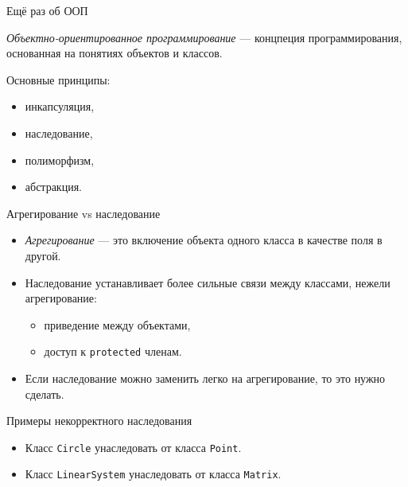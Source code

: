 \documentclass{beamer}
\begin{document}
\begin{frame}[fragile]{Ещё раз об ООП}

    {\em Объектно-ориентированное программирование} — 
    концпеция программирования, основанная на
    понятиях объектов и классов.

   \begin{block}{Основные принципы:}
   \begin{itemize}
       \item инкапсуляция,
       \item наследование,
       \item полиморфизм,
       \item абстракция.
   \end{itemize}
   \end{block}
\end{frame}

\begin{frame}[fragile]{Агрегирование vs наследование}
    \begin{itemize}
        \item {\em Агрегирование} — это включение объекта одного 
            класса в качестве поля в другой.

        \item Наследование устанавливает более сильные связи
            между классами, нежели агрегирование:
            \begin{itemize}
                \item приведение между объектами,
                \item доступ к {\tt protected} членам.
            \end{itemize}

        \item Если наследование можно заменить легко на агрегирование,
            то это нужно сделать.
    \end{itemize}
\begin{block}{Примеры некорректного наследования}
\begin{itemize}
    \item Класс {\tt Circle} унаследовать от класса {\tt Point}.
    \item Класс {\tt LinearSystem} унаследовать от класса {\tt Matrix}.
\end{itemize}
\end{block}
\end{frame}
\end{document}

